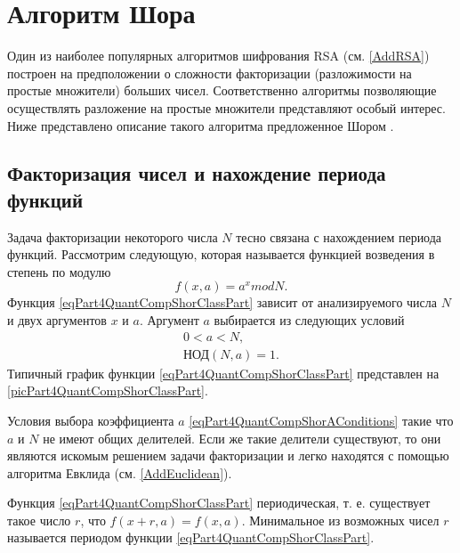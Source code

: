\section{Алгоритм Шора}
\label{Part4QuantCompShor}
Один из наиболее популярных алгоритмов шифрования RSA (см. 
\autoref{AddRSA}) 
построен на предположении о сложности факторизации
(разложимости на простые множители) больших чисел. Соответственно
алгоритмы позволяющие осуществлять разложение на простые множители
представляют особый интерес. Ниже представлено описание такого
алгоритма предложенное Шором \cite{bShor94}.

\subsection{Факторизация чисел и нахождение периода функций}
\label{sec:part4:algoshor:periodfind}
Задача факторизации некоторого числа $N$ тесно связана с нахождением периода
функций. Рассмотрим следующую, которая называется функцией возведения
в степень по модулю
\begin{equation}
f\left(x, a\right) = a^x mod N.
\label{eqPart4QuantCompShorClassPart}
\end{equation}
Функция \eqref{eqPart4QuantCompShorClassPart} зависит от
анализируемого числа $N$ и двух аргументов $x$ и $a$. Аргумент $a$
выбирается из следующих условий
\begin{eqnarray}
0 < a < N,
\nonumber \\
\mbox{НОД}\left(N, a\right) = 1.
\label{eqPart4QuantCompShorAConditions}
\end{eqnarray}
Типичный график функции \eqref{eqPart4QuantCompShorClassPart} представлен на
\autoref{picPart4QuantCompShorClassPart}.




Условия выбора коэффициента $a$
\eqref{eqPart4QuantCompShorAConditions} такие что $a$ и $N$ не имеют
общих делителей. Если же такие делители существуют, то они являются
искомым решением задачи факторизации и легко находятся с помощью
алгоритма Евклида (см. \autoref{AddEuclidean}).

Функция \eqref{eqPart4QuantCompShorClassPart} периодическая,
т. е. существует такое число $r$, что $f\left(x + r, a\right) = 
f\left(x, a\right)$. Минимальное из возможных чисел $r$ называется
периодом функции \eqref{eqPart4QuantCompShorClassPart}. 

